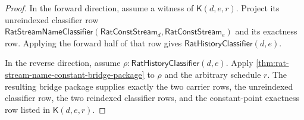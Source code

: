 \begin{proof}
In the forward direction, assume a witness of $\mathsf{K}(d,e,r)$. Project its
unreindexed classifier row
$\mathsf{RatStreamNameClassifier}(\mathsf{RatConstStream}_d,
\mathsf{RatConstStream}_e)$ and its exactness row. Applying the forward half of
that row gives $\mathsf{RatHistoryClassifier}(d,e)$.

In the reverse direction, assume
$\rho:\mathsf{RatHistoryClassifier}(d,e)$. Apply
\autoref{thm:rat-stream-name-constant-bridge-package} to $\rho$ and the
arbitrary schedule $r$. The resulting bridge package supplies exactly the two
carrier rows, the unreindexed classifier row, the two reindexed classifier rows,
and the constant-point exactness row listed in
$\mathsf{K}(d,e,r)$.
\end{proof}

